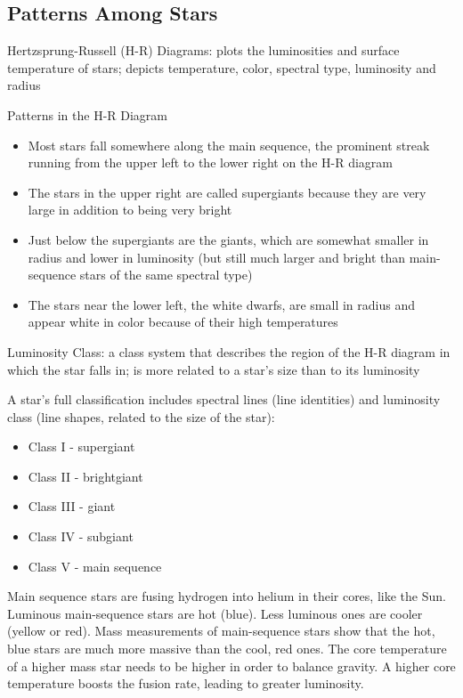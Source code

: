 \documentclass[12pt]{article}
\begin{document}
\subsection{Patterns Among Stars} 
\begin{definition} Hertzsprung-Russell (H-R) Diagrams: plots the luminosities and surface temperature of stars; depicts temperature, color, spectral type, luminosity and radius \end{definition}
Patterns in the H-R Diagram \begin{itemize} 
\item Most stars fall somewhere along the main sequence, the prominent streak running from the upper left to the lower right on the H-R diagram
\item The stars in the upper right are called supergiants because they are very large in addition to being very bright
\item Just below the supergiants are the giants, which are somewhat smaller in radius and lower in luminosity (but still much larger and bright than main-sequence stars of the same spectral type)
\item The stars near the lower left, the white dwarfs, are small in radius and appear white in color because of their high temperatures \end{itemize} 
\begin{definition} Luminosity Class: a class system that describes the region of the H-R diagram in which the star falls in; is more related to a star's size than to its luminosity \end{definition}
A star's full classification includes spectral lines (line identities) and luminosity class (line shapes, related to the size of the star): \begin{itemize} 
\item Class I - supergiant 
\item Class II - brightgiant 
\item Class III - giant
\item Class IV - subgiant 
\item Class V - main sequence \end{itemize} 
Main sequence stars are fusing hydrogen into helium in their cores, like the Sun. Luminous main-sequence stars are hot (blue). Less luminous ones are cooler (yellow or red). Mass measurements of main-sequence stars show that the hot, blue stars are much more massive than the cool, red ones. The core temperature of a higher mass star needs to be higher in order to balance gravity. A higher core temperature boosts the fusion rate, leading to greater luminosity. 
\end{document}
